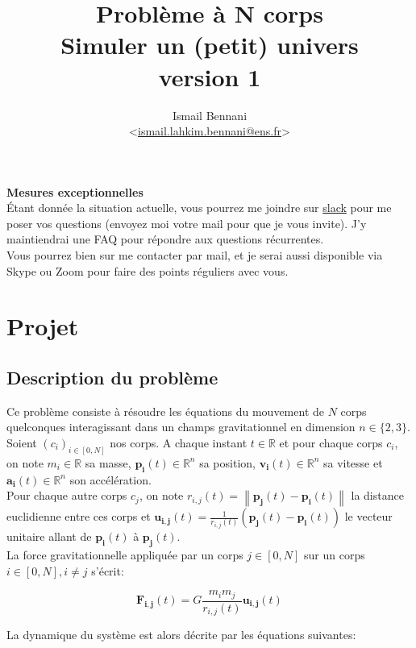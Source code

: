 \documentclass{article}
\title{\textbf{Problème à N corps} \\
       \Large Simuler un (petit) univers\\
       \small version 1}
\author{Ismail Bennani \\
        <\href{mailto:ismail.lahkim.bennani@ens.fr}{ismail.lahkim.bennani@ens.fr}>}
\date{}
\newcommand{\norm}[1]{\left\lVert#1\right\rVert}
\newcommand{\myvec}[1]{\ensuremath{\mathbf{#1}}}
\begin{document}
\maketitle

\noindent\textbf{Mesures exceptionnelles}\\
Étant donnée la situation actuelle, vous pourrez me joindre sur \href{https://join.slack.com/t/in104n-bodyproblem/shared_invite/zt-cu07sew6-nw8ikZtOZBy2UmpqReQdWA}{slack} pour me poser vos questions (envoyez moi votre mail pour que je vous invite). J'y maintiendrai une FAQ pour répondre aux questions récurrentes. \\
Vous pourrez bien sur me contacter par mail, et je serai aussi disponible via Skype ou Zoom pour faire des points réguliers avec vous.

\section{Projet}
\label{projet}

\subsection{Description du problème}

Ce problème consiste à résoudre les équations du mouvement de $N$ corps quelconques interagissant dans un champs gravitationnel en dimension ${n\in \{ 2,3 \}}$. \\
Soient $(c_i)_{i\in[0,N]}$ nos corps. A chaque instant $t \in \mathbb{R}$ et pour chaque corps $c_i$, on note $m_i \in \mathbb{R}$ sa masse, $\myvec{p_i}(t) \in \mathbb{R}^n$ sa position, $\myvec{v_i}(t) \in \mathbb{R}^n$ sa vitesse et $\myvec{a_i}(t) \in \mathbb{R}^n$ son accélération.\\
Pour chaque autre corps $c_j$, on note $r_{i,j}(t) = \norm{\myvec{p_j}(t) - \myvec{p_i}(t)}$ la distance euclidienne entre ces corps et $\myvec{u_{i,j}}(t) = \frac{1}{r_{i,j}(t)}(\myvec{p_j}(t)-\myvec{p_i}(t))$ le vecteur unitaire allant de $\myvec{p_i}(t)$ à $\myvec{p_j}(t)$.\\

La force gravitationnelle appliquée par un corps $j \in [0,N]$ sur un corps $i \in [0,N], i \ne j$ s'écrit:

\begin{equation*}
    \myvec{F_{i,j}}(t) = G \frac{m_im_j}{r_{i,j}(t)} \myvec{u_{i,j}}(t)
\end{equation*}

La dynamique du système est alors décrite par les équations suivantes:
\end{document}
